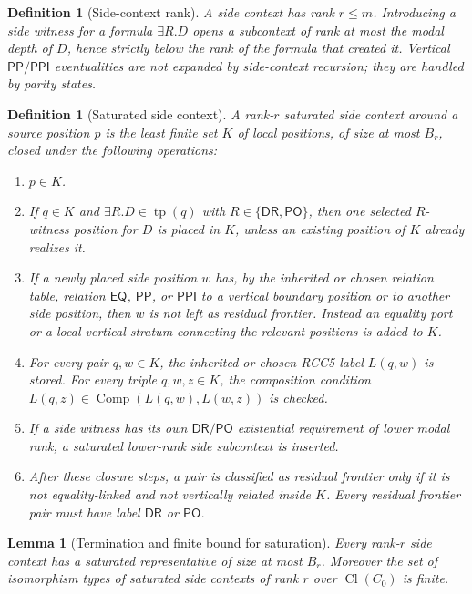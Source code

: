 \documentclass[11pt]{article}
\newtheorem{lemma}[theorem]{Lemma}
\newtheorem{definition}[theorem]{Definition}
\newcommand{\EQ}{\mathsf{EQ}}
\newcommand{\PP}{\mathsf{PP}}
\newcommand{\PPI}{\mathsf{PPI}}
\newcommand{\PO}{\mathsf{PO}}
\newcommand{\DR}{\mathsf{DR}}
\newcommand{\Comp}{\operatorname{Comp}}
\newcommand{\Cl}{\operatorname{Cl}}
\newcommand{\tp}{\operatorname{tp}}
\begin{document}
\begin{definition}[Side-context rank]
A side context has rank $r\le m$.  Introducing a side witness for a formula $\exists R.D$ opens a subcontext of rank at most the modal depth of $D$, hence strictly below the rank of the formula that created it.  Vertical $\PP/\PPI$ eventualities are not expanded by side-context recursion; they are handled by parity states.
\end{definition}

\begin{definition}[Saturated side context]
A rank-$r$ saturated side context around a source position $p$ is the least finite set $K$ of local positions, of size at most $B_r$, closed under the following operations:
\begin{enumerate}[label=(SC\arabic*)]
\item $p\in K$.
\item If $q\in K$ and $\exists R.D\in\tp(q)$ with $R\in\{\DR,\PO\}$, then one selected $R$-witness position for $D$ is placed in $K$, unless an existing position of $K$ already realizes it.
\item If a newly placed side position $w$ has, by the inherited or chosen relation table, relation $\EQ$, $\PP$, or $\PPI$ to a vertical boundary position or to another side position, then $w$ is not left as residual frontier.  Instead an equality port or a local vertical stratum connecting the relevant positions is added to $K$.
\item For every pair $q,w\in K$, the inherited or chosen RCC5 label $L(q,w)$ is stored.  For every triple $q,w,z\in K$, the composition condition $L(q,z)\in\Comp(L(q,w),L(w,z))$ is checked.
\item If a side witness has its own $\DR/\PO$ existential requirement of lower modal rank, a saturated lower-rank side subcontext is inserted.
\item After these closure steps, a pair is classified as residual frontier only if it is not equality-linked and not vertically related inside $K$.  Every residual frontier pair must have label $\DR$ or $\PO$.
\end{enumerate}
\end{definition}

\begin{lemma}[Termination and finite bound for saturation]
Every rank-$r$ side context has a saturated representative of size at most $B_r$.  Moreover the set of isomorphism types of saturated side contexts of rank $r$ over $\Cl(C_0)$ is finite.
\end{lemma}
\end{document}
